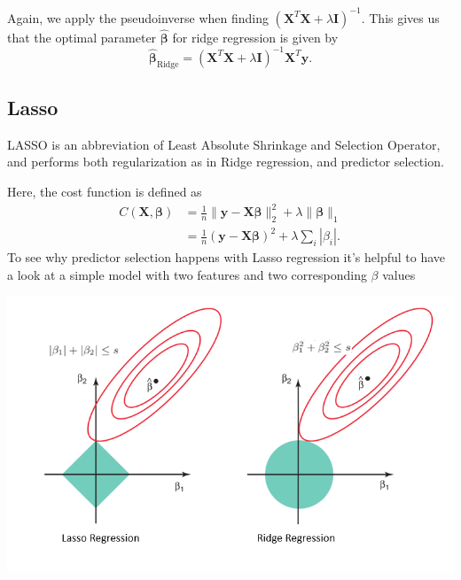 \documentclass{article}
\begin{document}
Again, we apply the pseudoinverse when finding $(\boldsymbol{X}^T \boldsymbol{X} + \lambda \boldsymbol{I})^{-1}$. This gives us that the optimal parameter $\boldsymbol{\hat{\beta}}$ for ridge regression is given by
\begin{equation*}
    \boldsymbol{\hat{\beta}}_\text{Ridge} = (\boldsymbol{X}^T \boldsymbol{X} + \lambda \boldsymbol{I})^{-1} \boldsymbol{X}^T \boldsymbol{y}.
\end{equation*} 




\subsection{Lasso}
LASSO is an abbreviation of Least Absolute Shrinkage and Selection Operator, and performs both regularization as in Ridge regression, and predictor selection.

Here, the cost function is defined as
\begin{align*}
    C \left( \boldsymbol{X}, \boldsymbol{\beta} \right) &= \frac{1}{n} \lVert \boldsymbol{y} - \boldsymbol{X\beta} \rVert_2^2 + \lambda \lVert \boldsymbol{\beta} \rVert_1 \\
    &= \frac{1}{n} \left( \boldsymbol{y} - \boldsymbol{X\beta} \right)^2 + \lambda \sum_i |\beta_i|.
\end{align*}
To see why predictor selection happens with Lasso regression it's helpful to have a look at a simple model with two features and two corresponding $\beta$ values

\begin{center}
    \includegraphics[width=\textwidth]{lasso_ridge_contour.png}
\end{center}
\end{document}

